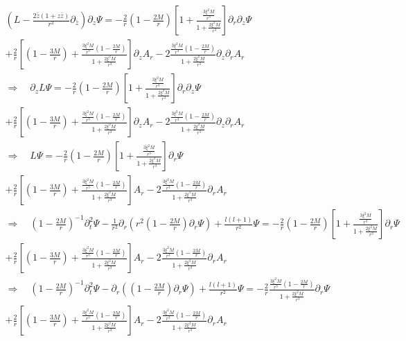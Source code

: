 \documentclass[12pt]{article}
\def\nn{\nonumber}
\begin{document}
\begin{gather}
\left(L
-
\frac{2 \bar{z} (1 + z \bar{z})}{r^{2}}
\partial_{\bar{z}}
\right)
\partial_{z}
\Psi
=
-
\frac{2}{r}
(1 - \frac{2 M}{r})
\left[
1
+
\frac{\frac{3 \xi^{2} M}{r^{3}}}{1 + \frac{2 \xi^{2} M}{r^{3}}}
\right]
\partial_{r} 
\partial_{z}
\Psi
\nn \\
+
\frac{2}{r}
\left[
(1 - \frac{3 M}{r})
+
\frac{\frac{3 \xi^{2} M}{r^{3}} (1 - \frac{2 M}{r}) }{1 + \frac{2 \xi^{2} M}{r^{3}}}
\right]
\partial_{z} A_{r}
-
2
\frac{\frac{3 \xi^{2} M}{r^{3}} (1 - \frac{2 M}{r})}{1 + \frac{2 \xi^{2} M}{r^{3}}}
\partial_{z}
\partial_{r}
A_{r}
\nn \\
\Rightarrow
\quad
\partial_{z}
L
\Psi
=
-
\frac{2}{r}
(1 - \frac{2 M}{r})
\left[
1
+
\frac{\frac{3 \xi^{2} M}{r^{3}}}{1 + \frac{2 \xi^{2} M}{r^{3}}}
\right]
\partial_{r} 
\partial_{z}
\Psi
\nn \\
+
\frac{2}{r}
\left[
(1 - \frac{3 M}{r})
+
\frac{\frac{3 \xi^{2} M}{r^{3}} (1 - \frac{2 M}{r}) }{1 + \frac{2 \xi^{2} M}{r^{3}}}
\right]
\partial_{z} A_{r}
-
2
\frac{\frac{3 \xi^{2} M}{r^{3}} (1 - \frac{2 M}{r})}{1 + \frac{2 \xi^{2} M}{r^{3}}}
\partial_{z}
\partial_{r}
A_{r}
\nn \\
\Rightarrow
\quad
L
\Psi
=
-
\frac{2}{r}
(1 - \frac{2 M}{r})
\left[
1
+
\frac{\frac{3 \xi^{2} M}{r^{3}}}{1 + \frac{2 \xi^{2} M}{r^{3}}}
\right]
\partial_{r} 
\Psi
\nn \\
+
\frac{2}{r}
\left[
(1 - \frac{3 M}{r})
+
\frac{\frac{3 \xi^{2} M}{r^{3}} (1 - \frac{2 M}{r}) }{1 + \frac{2 \xi^{2} M}{r^{3}}}
\right]
A_{r}
-
2
\frac{\frac{3 \xi^{2} M}{r^{3}} (1 - \frac{2 M}{r})}{1 + \frac{2 \xi^{2} M}{r^{3}}}
\partial_{r}
A_{r}
\nn \\
\Rightarrow
\quad
(1 - \frac{2 M}{r})^{-1}
\partial^{2}_{t}
\Psi
-
\frac{1}{r^{2}}
\partial_{r}
\left(
r^{2} (1 - \frac{2 M}{r})
\partial_{r}
\Psi
\right)
+
\frac{l (l + 1)}{r^{2}}
\Psi
=
-
\frac{2}{r}
(1 - \frac{2 M}{r})
\left[
1
+
\frac{\frac{3 \xi^{2} M}{r^{3}}}{1 + \frac{2 \xi^{2} M}{r^{3}}}
\right]
\partial_{r} 
\Psi
\nn \\
+
\frac{2}{r}
\left[
(1 - \frac{3 M}{r})
+
\frac{\frac{3 \xi^{2} M}{r^{3}} (1 - \frac{2 M}{r}) }{1 + \frac{2 \xi^{2} M}{r^{3}}}
\right]
A_{r}
-
2
\frac{\frac{3 \xi^{2} M}{r^{3}} (1 - \frac{2 M}{r})}{1 + \frac{2 \xi^{2} M}{r^{3}}}
\partial_{r}
A_{r}
\nn \\
\Rightarrow
\quad
(1 - \frac{2 M}{r})^{-1}
\partial^{2}_{t}
\Psi
-
\partial_{r}
\left(
(1 - \frac{2 M}{r})
\partial_{r}
\Psi
\right)
+
\frac{l (l + 1)}{r^{2}}
\Psi
=
-
\frac{2}{r}
\frac{\frac{3 \xi^{2} M}{r^{3}} (1 - \frac{2 M}{r})}{1 + \frac{2 \xi^{2} M}{r^{3}}}
\partial_{r} 
\Psi
\nn \\
+
\frac{2}{r}
\left[
(1 - \frac{3 M}{r})
+
\frac{\frac{3 \xi^{2} M}{r^{3}} (1 - \frac{2 M}{r}) }{1 + \frac{2 \xi^{2} M}{r^{3}}}
\right]
A_{r}
-
2
\frac{\frac{3 \xi^{2} M}{r^{3}} (1 - \frac{2 M}{r})}{1 + \frac{2 \xi^{2} M}{r^{3}}}
\partial_{r}
A_{r}
\end{gather}
\end{document}
